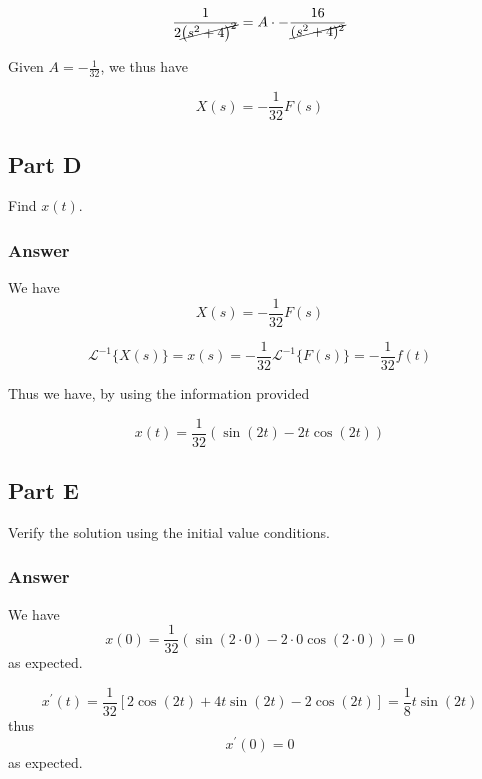 \documentclass{article}
\begin{document}
$$
\frac{1}{2\cancel{\left(s^2+4\right)^2}} = A \cdot -\frac{16}{\cancel{(s^2+4)^2}}
$$

Given $A=-\frac{1}{32}$, we thus have

$$X(s) = -\frac{1}{32} F(s)$$

\subsection*{Part D}
Find $x(t)$.
\subsubsection*{Answer}
We have
$$X(s) = -\frac{1}{32} F(s)$$

$$\mathcal{L}^{-1}\{X(s)\} = x(s) = -\frac{1}{32} \mathcal{L}^{-1}\{F(s)\} = -\frac{1}{32} f(t)$$

Thus we have, by using the information provided

$$
x(t) = \frac{1}{32} \left( \sin(2t) - 2t\cos(2t)\right)
$$

\subsection*{Part E}
Verify the solution using the initial value conditions.
\subsubsection*{Answer}

We have
$$x(0) = \frac{1}{32} \left( \sin(2 \cdot 0) - 2\cdot 0 \cos(2\cdot 0)\right) = 0$$
as expected.

$$x^{'}(t) = \frac{1}{32} \left[2\cos(2t)+4t\sin(2t)-2\cos(2t)\right] = \frac{1}{8}t \sin(2t)$$
thus
$$x^{'}(0) = 0$$
as expected. 
\end{document}
